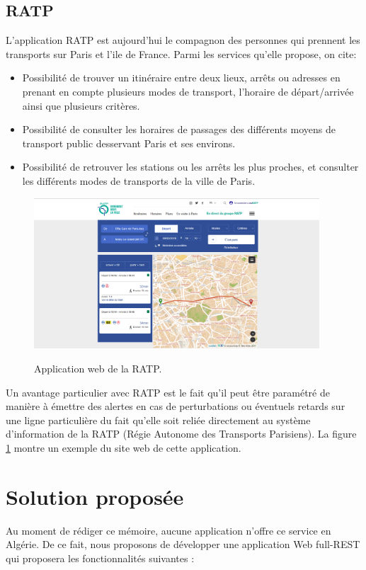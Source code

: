 \subsection{RATP}
L'application RATP est aujourd'hui le compagnon des personnes qui prennent les transports sur Paris et l'ile de France.
Parmi les services qu'elle propose, on cite:
\begin{itemize}
	\item Possibilité de trouver un itinéraire entre deux lieux, arrêts ou adresses en prenant en compte plusieurs modes de transport, l'horaire de départ/arrivée ainsi que plusieurs critères.
	\item Possibilité de consulter les horaires de passages des différents moyens de transport public desservant Paris et ses environs. 
	\item Possibilité de retrouver les stations ou les arrêts les plus proches, et consulter les différents modes de transports de la ville de Paris.
\end{itemize}

\begin{figure}[h!]
	\center
	\includegraphics[width=0.95\textwidth]{img/ratp.png}
	\label{fig:RATP}
	\caption{Application web de la RATP.}
\end{figure}
Un avantage particulier avec RATP est le fait qu'il peut être paramétré de manière à émettre des alertes en cas de perturbations ou éventuels retards sur une ligne particulière du fait qu'elle soit reliée directement au système d'information de la RATP (Régie Autonome des Transports Parisiens).
La figure \ref{fig:RATP} montre un exemple du site web de cette application.

\section{Solution proposée}
Au moment de rédiger ce mémoire, aucune application n'offre ce service en Algérie. \newline
De ce fait, nous proposons de développer une application Web full-REST qui proposera les fonctionnalités suivantes : 

